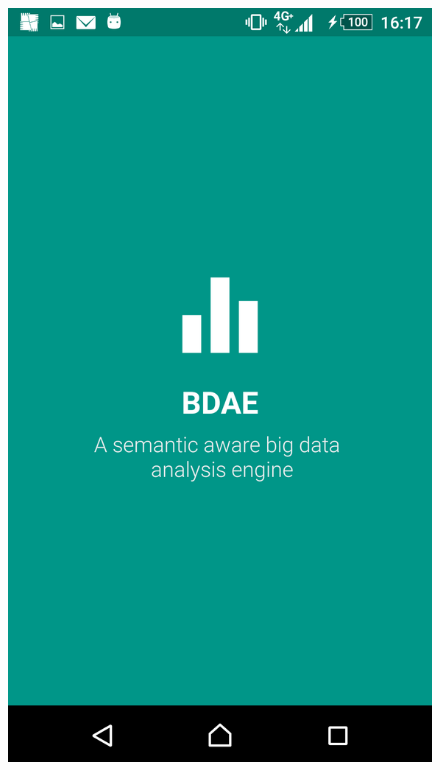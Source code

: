 \begin{figure}[h!]
	\centering
  	\begin{minipage}[b]{0.4\textwidth}
    		\includegraphics[width=\textwidth]{img/loadingscreen.png}
    \end{minipage}
  	\hfill
  	\begin{minipage}[b]{0.4\textwidth}

\end{minipage}
\end{figure}
